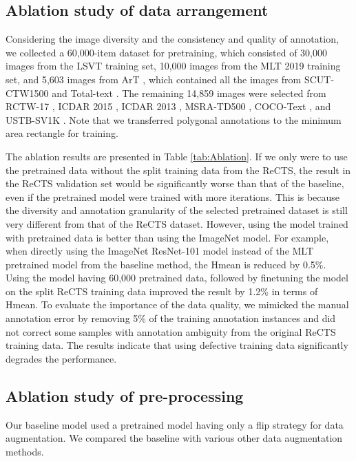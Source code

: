 \subsection{Ablation study of data arrangement}
Considering the image diversity and the consistency and quality of annotation, we collected a 60,000-item dataset for pretraining, which consisted of 30,000 images from the LSVT \cite{sun2019icdar} training set, 10,000 images from the MLT 2019 \cite{nayef2019icdar2019} training set, and 5,603 images from ArT \cite{chng2019icdar2019}, which contained all the images from SCUT-CTW1500 \cite{liu2019curved} and Total-text \cite{kheng2017total,ch2019total}. The remaining 14,859 images were selected from RCTW-17 \cite{shi2017icdar2017}, ICDAR 2015 \cite{karatzas2015icdar}, ICDAR 2013 \cite{Karatzas2013ICDAR}, MSRA-TD500 \cite{Yao2012Detecting}, COCO-Text \cite{veit2016coco}, and USTB-SV1K \cite{Yin2015Multi}. Note that we transferred polygonal annotations to the minimum area rectangle for training.


The ablation results are presented in Table \ref{tab:Ablation}. If we only were to use the pretrained data without the split training data from the ReCTS, the result in the ReCTS validation set would be significantly worse than that of the baseline, even if the pretrained model were trained with more iterations. This is because the diversity and annotation granularity of the selected pretrained dataset is still very different from that of the ReCTS dataset. However, using the model trained with pretrained data is better than using the ImageNet model. For example, when directly using the ImageNet ResNet-101 model instead of the MLT pretrained model from the baseline method, the Hmean is reduced by 0.5\%. Using the model having 60,000 pretrained data, followed by finetuning the model on the split ReCTS training data improved the result by 1.2\% in terms of Hmean. To evaluate the importance of the data quality, we mimicked the manual annotation error by removing 5\% of the training annotation instances and did not correct some samples with annotation ambiguity from the original ReCTS training data. The results indicate that using defective training data significantly degrades the performance.


\subsection{Ablation study of pre-processing}
\label{subsec:ab_pre}
Our baseline model used a pretrained model having only a flip strategy for data augmentation. We compared the baseline with various other data augmentation methods.

